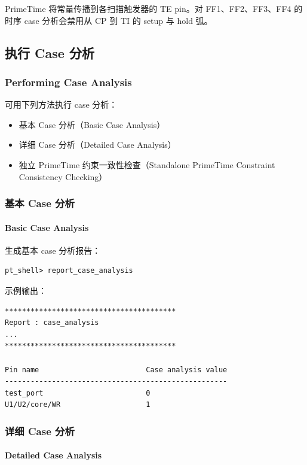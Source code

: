 PrimeTime 将常量传播到各扫描触发器的 TE pin。对 FF1、FF2、FF3、FF4 的时序 case 分析会禁用从 CP 到 TI 的 setup 与 hold 弧。

\subsection{执行 Case 分析}
\subsubsection*{Performing Case Analysis}

可用下列方法执行 case 分析：
\begin{itemize}
  \item 基本 Case 分析（Basic Case Analysis）
  \item 详细 Case 分析（Detailed Case Analysis）
  \item 独立 PrimeTime 约束一致性检查（Standalone PrimeTime Constraint Consistency Checking）
\end{itemize}

\subsubsection{基本 Case 分析}
\paragraph*{Basic Case Analysis}

生成基本 case 分析报告：
\begin{lstlisting}
pt_shell> report_case_analysis
\end{lstlisting}

示例输出：
\begin{lstlisting}
****************************************
Report : case_analysis
...
****************************************

Pin name                         Case analysis value
----------------------------------------------------
test_port                        0
U1/U2/core/WR                    1
\end{lstlisting}

\subsubsection{详细 Case 分析}
\paragraph*{Detailed Case Analysis}

